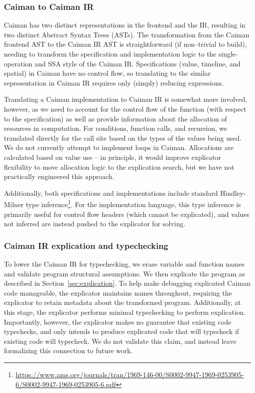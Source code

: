 \subsubsection{Caiman to Caiman IR}

Caiman has two distinct representations in the frontend and the IR, resulting in two distinct Abstract Syntax Trees (ASTs).  The transformation from the Caiman frontend AST to the Caiman IR AST is straightforward (if non--trivial to build), needing to transform the specification and implementation logic to the single-operation and SSA style of the Caiman IR.  Specifications (value, timeline, and spatial) in Caiman have no control flow, so translating to the similar representation in Caiman IR requires only (simply) reducing expressions.  

Translating a Caiman implementation to Caiman IR is somewhat more involved, however, as we need to account for the control flow of the function (with respect to the specification) as well as provide information about the allocation of resources in computation.  For conditions, function calls, and recursion, we translated directly for the call site based on the types of the values being used.  We do not currently attempt to implement loops in Caiman.  Allocations are calculated based on value use -- in principle, it would improve explicator flexibility to move allocation logic to the explication search, but we have not practically engineered this approach.

Additionally, both specifications and implementations include standard Hindley-Milner type inference\footnote{\url{https://www.ams.org/journals/tran/1969-146-00/S0002-9947-1969-0253905-6/S0002-9947-1969-0253905-6.pdf}}.  For the implementation language, this type inference is primarily useful for control flow headers (which cannot be explicated), and values not inferred are instead pushed to the explicator for solving.

\subsubsection{Caiman IR explication and typechecking}

To lower the Caiman IR for typechecking, we erase variable and function names and validate program structural assumptions.  We then explicate the program as described in Section~\ref{sec:explication}.  To help make debugging explicated Caiman code manageable, the explicator maintains names throughout, requiring the explicator to retain metadata about the transformed program.  Additionally, at this stage, the explicator performs minimal typechecking to perform explication.  Importantly, however, the explicator makes no guarantee that existing code typechecks, and only intends to produce explicated code that will typecheck if existing code will typecheck.  We do not validate this claim, and instead leave formalizing this connection to future work.


